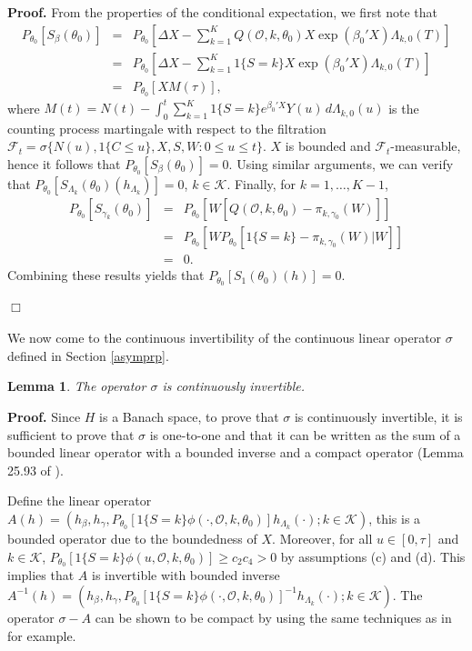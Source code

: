 \documentclass{statsoc}
\newtheorem{lemma}[theorem]{Lemma}
\begin{document}
\textbf{Proof.} From the properties of the conditional expectation, we first note that
\begin{eqnarray*}
P_{\theta_0}\left[S_\beta(\theta_0)\right]&=&P_{\theta_0}\left[\Delta X-\sum_{k=1}^K Q(\mathcal O,k,\theta_0)X\exp(\beta_0'X)\Lambda_{k,0}(T)\right]\\
&=&P_{\theta_0}\left[\Delta X-\sum_{k=1}^K 1\{S=k\}X\exp(\beta_0'X)\Lambda_{k,0}(T)\right]\\
&=&P_{\theta_0}\left[XM(\tau)\right],
\end{eqnarray*}
where $M(t)=N(t)-\int_0^t\sum_{k=1}^K1\{S=k\}e^{\beta_0'X}Y(u)\,d\Lambda_{k,0}(u)$ is the counting process martingale with respect to the filtration $\mathcal F_t=\sigma\{N(u), 1\{C\leq u\}, X, S, W:0\leq u\leq t\}$. $X$ is bounded and $\mathcal F_t$-measurable, hence it follows that $P_{\theta_0}[S_\beta(\theta_0)]=0$. Using similar arguments, we can verify that $P_{\theta_0}[S_{\Lambda_k}(\theta_0)(h_{\Lambda_k})]=0$, $k\in\mathcal K$. Finally, for $k=1,\ldots,K-1$,
\begin{eqnarray*}
P_{\theta_0}\left[S_{\gamma_k}(\theta_0)\right]&=&P_{\theta_0}\left[W\left[Q(\mathcal O,k,\theta_0)-\pi_{k,\gamma_0}(W)\right]\right]\\
&=&P_{\theta_0}\left[WP_{\theta_0}\left[1\{S=k\}-\pi_{k,\gamma_0}(W)|W\right]\right]\\
&=&0.
\end{eqnarray*}
Combining these results yields that $P_{\theta_0}\left[S_1(\theta_0)(h)\right]=0$.
\\
\\
$\Box$
\\
\\
We now come to the continuous invertibility of the continuous linear operator $\sigma$ defined in Section \ref{asymprp}.
\begin{lemma}\label{infoope}
The operator $\sigma$ is continuously invertible.
\end{lemma}

\textbf{Proof.} Since $H$ is a Banach space, to prove that $\sigma$ is continuously invertible, it is sufficient to prove that $\sigma$ is one-to-one and that it can be written as the sum of a bounded linear operator with a bounded inverse and a compact operator (Lemma 25.93 of \cite{vdv98}).

Define the linear operator $A(h)=(h_\beta, h_\gamma, P_{\theta_0}\left[ 1\{S=k\} \phi(\cdot,\mathcal O,k,\theta_0)\right]h_{\Lambda_k}(\cdot);k\in\mathcal K)$, this is a bounded operator due to the boundedness of $X$. Moreover, for all $u\in[0,\tau]$ and $k\in\mathcal K$, $P_{\theta_0}\left[ 1\{S=k\} \phi(u,\mathcal O,k,\theta_0)\right]\geq c_2c_4>0$ by assumptions (c) and (d). This implies that $A$ is invertible with bounded inverse $A^{-1}(h)=(h_\beta, h_\gamma, P_{\theta_0}\left[ 1\{S=k\} \phi(\cdot,\mathcal O,k,\theta_0)\right]^{-1}h_{\Lambda_k}(\cdot);k\in\mathcal K)$. The operator $\sigma-A$ can be shown to be compact by using the same techniques as in \cite{lu08} for example.
\end{document}
